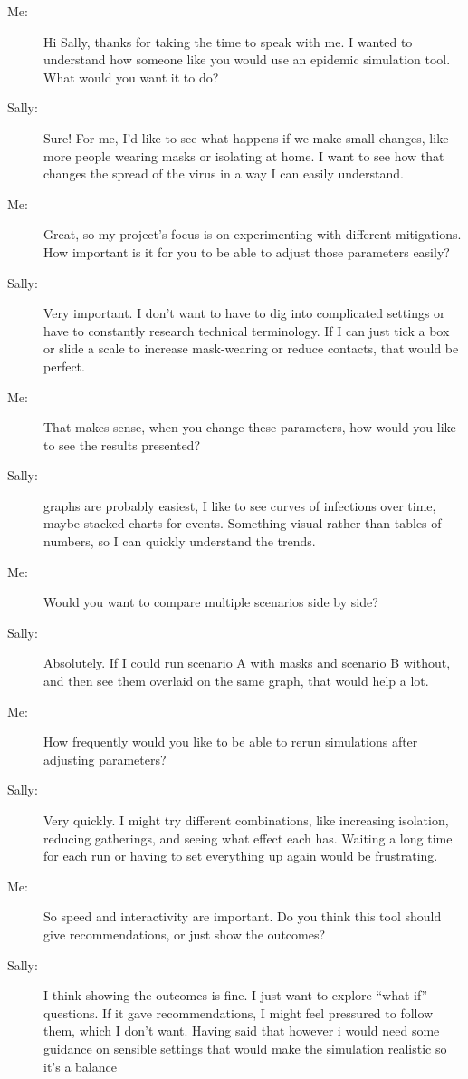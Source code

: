 \begin{description}
  \item[Me:] Hi Sally, thanks for taking the time to speak with me. I wanted to understand how someone like you would use an epidemic simulation tool. What would you want it to do?
  \item[Sally:] Sure! For me, I’d like to see what happens if we make small changes, like more people wearing masks or isolating at home. I want to see how that changes the spread of the virus in a way I can easily understand.
  
  \item[Me:] Great, so my project's focus is on experimenting with different mitigations. How important is it for you to be able to adjust those parameters easily?
  \item[Sally:] Very important. I don’t want to have to dig into complicated settings or have to constantly research technical terminology. If I can just tick a box or slide a scale to increase mask-wearing or reduce contacts, that would be perfect.
  
  \item[Me:] That makes sense, when you change these parameters, how would you like to see the results presented?
  \item[Sally:] graphs are probably easiest, I like to see curves of infections over time, maybe stacked charts for events. Something visual rather than tables of numbers, so I can quickly understand the trends.
  
  \item[Me:] Would you want to compare multiple scenarios side by side?
  \item[Sally:] Absolutely. If I could run scenario A with masks and scenario B without, and then see them overlaid on the same graph, that would help a lot.
  
  \item[Me:] How frequently would you like to be able to rerun simulations after adjusting parameters?
  \item[Sally:] Very quickly. I might try different combinations, like increasing isolation, reducing gatherings, and seeing what effect each has. Waiting a long time for each run or having to set everything up again would be frustrating.
  
  \item[Me:] So speed and interactivity are important. Do you think this tool should give recommendations, or just show the outcomes?
  \item[Sally:] I think showing the outcomes is fine. I just want to explore “what if” questions. If it gave recommendations, I might feel pressured to follow them, which I don’t want. Having said that however i would need some guidance on sensible settings that would make the simulation realistic so it's a balance
  

\end{description}
